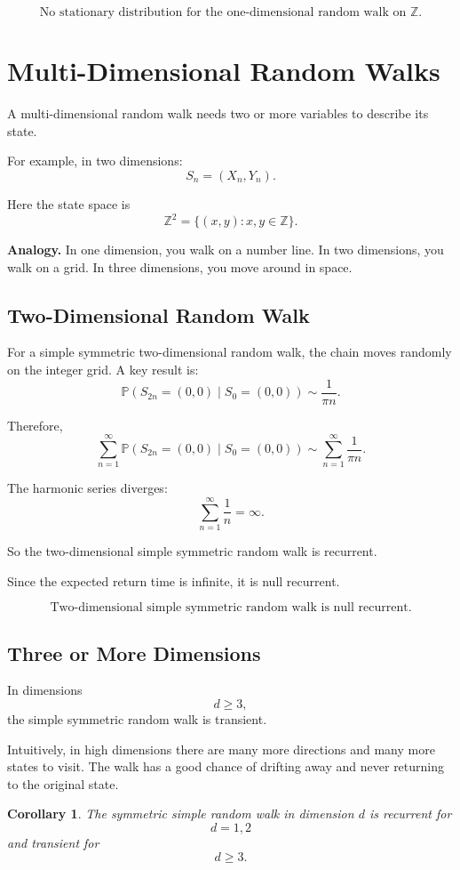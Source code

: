 \documentclass[12pt,a4paper]{article}
\theoremstyle{lecturestyle}
\newtheorem{corollary}{Corollary}
\newcommand{\Prob}{\mathbb{P}}
\begin{document}
\[
\boxed{\text{No stationary distribution for the one-dimensional random walk on }\mathbb{Z}.}
\]

\section{Multi-Dimensional Random Walks}

A multi-dimensional random walk needs two or more variables to describe its state.

For example, in two dimensions:
\[
S_n=(X_n,Y_n).
\]

Here the state space is
\[
\mathbb{Z}^2=\{(x,y):x,y\in\mathbb{Z}\}.
\]

\textbf{Analogy.} In one dimension, you walk on a number line. In two dimensions, you walk on a grid. In three dimensions, you move around in space.

\subsection{Two-Dimensional Random Walk}

For a simple symmetric two-dimensional random walk, the chain moves randomly on the integer grid. A key result is:
\[
\Prob(S_{2n}=(0,0)\mid S_0=(0,0))
\sim
\frac{1}{\pi n}.
\]

Therefore,
\[
\sum_{n=1}^{\infty}\Prob(S_{2n}=(0,0)\mid S_0=(0,0))
\sim
\sum_{n=1}^{\infty}\frac1{\pi n}.
\]

The harmonic series diverges:
\[
\sum_{n=1}^{\infty}\frac1n=\infty.
\]

So the two-dimensional simple symmetric random walk is recurrent.

Since the expected return time is infinite, it is null recurrent.

\[
\boxed{\text{Two-dimensional simple symmetric random walk is null recurrent}.}
\]

\subsection{Three or More Dimensions}

In dimensions
\[
d\geq 3,
\]
the simple symmetric random walk is transient.

Intuitively, in high dimensions there are many more directions and many more states to visit. The walk has a good chance of drifting away and never returning to the original state.

\begin{corollary}
The symmetric simple random walk in dimension $d$ is recurrent for
\[
d=1,2
\]
and transient for
\[
d\geq 3.
\]
\end{corollary}
\end{document}
